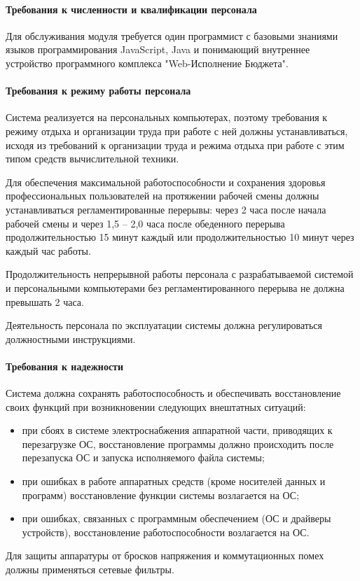 \documentclass[a4paper]{extarticle}
\numberwithin{equation}{section}
\begin{document}
\paragraph{Требования к численности и квалификации персонала}
Для обслуживания модуля требуется один программист с базовыми знаниями языков программирования JavaScript, Java и понимающий внутреннее устройство программного комплекса "Web-Исполнение Бюджета".

\paragraph{Требования к режиму работы персонала}
Система реализуется на персональных компьютерах, поэтому требования к режиму отдыха и организации труда при работе с ней должны устанавливаться, исходя из требований к организации труда и режима отдыха при работе с этим типом средств вычислительной техники.\par
Для обеспечения максимальной работоспособности и сохранения здоровья профессиональных пользователей на протяжении рабочей смены должны устанавливаться регламентированные перерывы: через 2 часа после начала рабочей смены и через 1,5 – 2,0 часа после обеденного перерыва продолжительностью 15 минут каждый или продолжительностью 10 минут через каждый час работы.\par
Продолжительность непрерывной работы персонала с разрабатываемой системой и персональными компьютерами без регламентированного перерыва не должна превышать 2 часа.\par
Деятельность персонала по эксплуатации системы должна регулироваться должностными инструкциями.

\paragraph{Требования к надежности}
Система должна сохранять работоспособность и обеспечивать восстановление своих функций при возникновении следующих внештатных ситуаций:\par
\begin{itemize}
	\item при сбоях в системе электроснабжения аппаратной части, приводящих к перезагрузке ОС, восстановление программы должно происходить после перезапуска ОС и запуска исполняемого файла системы;
	\item при ошибках в работе аппаратных средств (кроме носителей данных и программ) восстановление функции системы возлагается на ОС;
	\item при ошибках, связанных с программным обеспечением (ОС и драйверы устройств), восстановление работоспособности возлагается на ОС.\par
\end{itemize}\par
Для защиты аппаратуры от бросков напряжения и коммутационных помех должны применяться сетевые фильтры.
\end{document}
